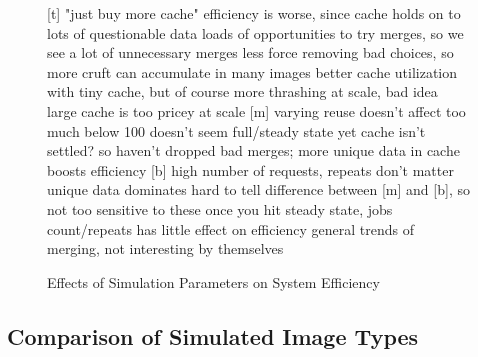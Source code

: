 \documentclass[sigconf]{acmart}
\begin{document}
\begin{figure}[ht]
\caption{Effects of Simulation Parameters on System Efficiency}
\label{fig:sensitivity}
[t] "just buy more cache"
efficiency is worse, since cache holds on to lots of questionable data
loads of opportunities to try merges, so we see a lot of unnecessary merges
less force removing bad choices, so more cruft can accumulate in many images
better cache utilization with tiny cache, but of course more thrashing
at scale, bad idea
large cache is too pricey at scale
[m] varying reuse doesn't affect too much
below 100 doesn't seem full/steady state yet
cache isn't settled? so haven't dropped bad merges; more unique data in cache boosts efficiency
[b] high number of requests, repeats don't matter
unique data dominates
hard to tell difference between [m] and [b], so not too sensitive to these
once you hit steady state, jobs count/repeats has little effect on efficiency
general trends of merging, not interesting by themselves
\fi
\end{figure}    

\subsection{Comparison of Simulated Image Types}
\end{document}
